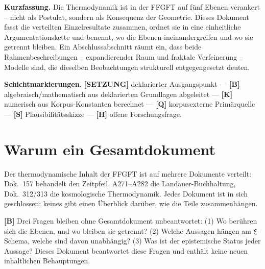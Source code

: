 
\providecommand{\qedsq}{\raisebox{0.03em}{\framebox[0.62em]{\rule{0pt}{0.42em}}}}

\begingroup\small\noindent
\textbf{Kurzfassung.}
Die Thermodynamik ist in der FFGFT auf fünf Ebenen verankert –
nicht als Postulat, sondern als Konsequenz der Geometrie.
Dieses Dokument fasst die verteilten Einzelresultate zusammen,
ordnet sie in eine einheitliche Argumentationskette und benennt,
wo die Ebenen ineinandergreifen und wo sie getrennt bleiben.
Ein Abschlussabschnitt räumt ein, dass beide Rahmenbeschreibungen –
expandierender Raum und fraktale Verfeinerung – Modelle sind,
die dieselben Beobachtungen strukturell entgegengesetzt deuten.
\par\endgroup

\bigskip

\begingroup\small\noindent
\textbf{Schichtmarkierungen.}
\textbf{[SETZUNG]} deklarierter Ausgangspunkt ---
\textbf{[B]} algebraisch/mathematisch aus deklarierten Grundlagen abgeleitet ---
\textbf{[K]} numerisch aus Korpus-Konstanten berechnet ---
\textbf{[Q]} korpusexterne Primärquelle ---
\textbf{[S]} Plausibilitätsskizze ---
\textbf{[H]} offene Forschungsfrage.
\par\endgroup

\bigskip

\section{Warum ein Gesamtdokument}

Der thermodynamische Inhalt der FFGFT ist auf mehrere Dokumente verteilt:
Dok.~157 behandelt den Zeitpfeil, A271--A282 die Landauer-Buchhaltung,
Dok.~312/313 die kosmologische Thermodynamik.
Jedes Dokument ist in sich geschlossen; keines gibt einen Überblick
darüber, wie die Teile zusammenhängen.

\textbf{[B]} Drei Fragen bleiben ohne Gesamtdokument unbeantwortet:
(1) Wo berühren sich die Ebenen, und wo bleiben sie getrennt?
(2) Welche Aussagen hängen am $\xi$-Schema, welche sind davon unabhängig?
(3) Was ist der epistemische Status jeder Aussage?
Dieses Dokument beantwortet diese Fragen und enthält keine
neuen inhaltlichen Behauptungen.

